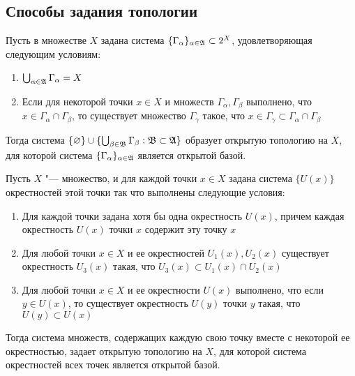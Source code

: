 \subsection{Способы задания топологии}

\begin{example}
    Пусть в множестве $X$ задана система $\{\Gamma_{\alpha}\}_{\alpha \in \mathfrak A} \subset 2^X$, удовлетворяющая следующим условиям:
    \begin{enumerate}
        \item $\bigcup_{\alpha \in \mathfrak A} \Gamma_\alpha = X$
        
        \item Если для некоторой точки $x \in X$ и множеств $\Gamma_\alpha, \Gamma_\beta$ выполнено, что $x \in \Gamma_{\alpha}\cap\Gamma_{\beta}$, то существует множество $\Gamma_{\gamma}$ такое, что $x\in\Gamma_{\gamma}\subset \Gamma_{\alpha}\cap\Gamma_{\beta}$
    \end{enumerate}

    Тогда система $\{\varnothing\} \cup \{\bigcup_{\beta \in \mathfrak B} \Gamma_\beta: \mathfrak B \subset \mathfrak A\}$ образует открытую топологию на $X$, для которой система $\{\Gamma_{\alpha}\}_{\alpha \in \mathfrak A}$ является открытой базой.
\end{example}

\begin{example}
    Пусть $X$ "--- множество, и для каждой точки $x \in X$ задана система $\{U(x)\}$ окрестностей этой точки так что выполнены следующие условия:
    \begin{enumerate}
        \item Для каждой точки задана хотя бы одна окрестность $U(x)$, причем каждая окрестность $U(x)$ точки $x$ содержит эту точку $x$
        
        \item Для любой точки $x \in X$ и ее окрестностей $U_1(x), U_2(x)$ существует окрестность $U_3(x)$ такая, что $U_3(x)\subset U_1(x)\cap U_2(x)$
        
        \item Для любой точки $x \in X$ и ее окрестности $U(x)$ выполнено, что если $y \in U(x)$, то существует окрестность $U(y)$ точки $y$ такая, что $U(y) \subset U(x)$
    \end{enumerate}

    Тогда система множеств, содержащих каждую свою точку вместе с некоторой ее окрестностью, задает открытую топологию на $X$, для которой система окрестностей всех точек является открытой базой.
\end{example}

